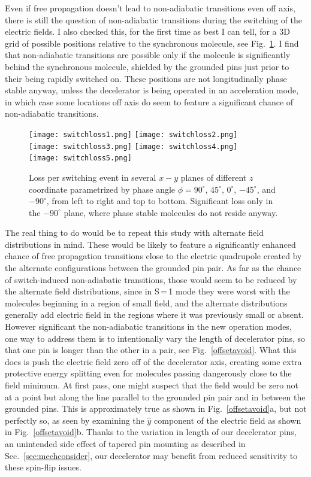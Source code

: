 Even if free propagation doesn't lead to non-adiabatic transitions even off axis, there is still the question of non-adiabatic transitions during the switching of the electric fields.
I also checked this, for the first time as best I can tell, for a 3D grid of possible positions relative to the synchronous molecule, see Fig.~\ref{nonadiabatic2}.
I find that non-adiabatic transitions are possible only if the molecule is significantly behind the synchronous molecule, shielded by the grounded pins just prior to their being rapidly switched on.
These positions are not longitudinally phase stable anyway, unless the decelerator is being operated in an acceleration mode, in which case some locations off axis do seem to feature a significant chance of non-adiabatic transitions.
\begin{figure}[t!]
\centering
\vspace{0.5mm}
\texttt{[image: switchloss1.png]}
\texttt{[image: switchloss2.png]}\\
\texttt{[image: switchloss3.png]}
\texttt{[image: switchloss4.png]}\\
\texttt{[image: switchloss5.png]}
\caption[Non-adiabatic Losses during Switching]{\label{nonadiabatic2}
Loss per switching event in several $x-y$ planes of different $z$ coordinate parametrized by phase angle $\phi=90^\circ$, $45^\circ$, $0^\circ$, $-45^\circ$, and $-90^\circ$, from left to right and top to bottom.
Significant loss only in the $-90^\circ$ plane, where phase stable molecules do not reside anyway.}
\end{figure}
The real thing to do would be to repeat this study with alternate field distributions in mind.
These would be likely to feature a significantly enhanced chance of free propagation transitions close to the electric quadrupole created by the alternate configurations between the grounded pin pair.
As far as the chance of switch-induced non-adiabatic transitions, those would seem to be reduced by the alternate field distributions, since in S\,=\,1 mode they were worst with the molecules beginning in a region of small field, and the alternate distributions generally add electric field in the regions where it was previously small or absent.
However significant the non-adiabatic transitions in the new operation modes, one way to address them is to intentionally vary the length of decelerator pins, so that one pin is longer than the other in a pair, see Fig.~\ref{offsetavoid}.
What this does is push the electric field zero off of the decelerator axis, creating some extra protective energy splitting even for molecules passing dangerously close to the field minimum.
At first pass, one might suspect that the field would be zero not at a point but along the line parallel to the grounded pin pair and in between the grounded pins.
This is approximately true as shown in Fig.~\ref{offsetavoid}a, but not perfectly so, as seen by examining the $\hat{y}$ component of the electric field as shown in Fig.~\ref{offsetavoid}b.
Thanks to the variation in length of our decelerator pins, an unintended side effect of tapered pin mounting as described in Sec.~\ref{sec:mechconsider}, our decelerator may benefit from reduced sensitivity to these spin-flip issues.

